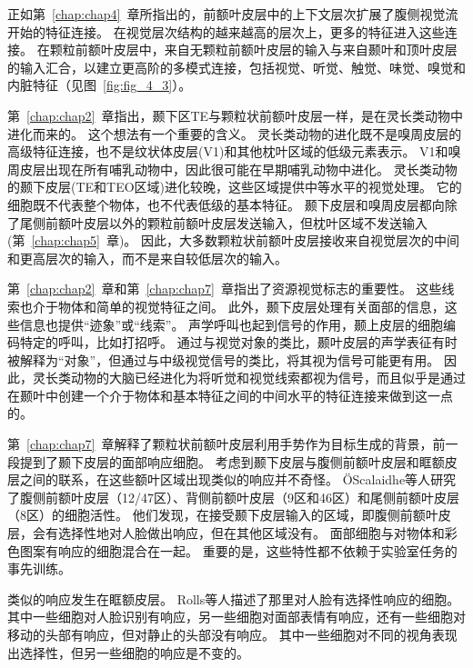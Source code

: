正如第~\ref{chap:chap4}~章所指出的，前额叶皮层中的上下文层次扩展了腹侧视觉流开始的特征连接\cite{murray2007visual}。
在视觉层次结构的越来越高的层次上，更多的特征进入这些连接。
在颗粒前额叶皮层中，来自无颗粒前额叶皮层的输入与来自颞叶和顶叶皮层的输入汇合，以建立更高阶的多模式连接，包括视觉、听觉、触觉、味觉、嗅觉和内脏特征（见图~\ref{fig:fig_4_3}）。
\par


第~\ref{chap:chap2}~章指出，颞下区TE与颗粒状前额叶皮层一样，是在灵长类动物中进化而来的。
这个想法有一个重要的含义。
灵长类动物的进化既不是嗅周皮层的高级特征连接，也不是纹状体皮层(V1)和其他枕叶区域的低级元素表示。
V1和嗅周皮层出现在所有哺乳动物中，因此很可能在早期哺乳动物中进化。
灵长类动物的颞下皮层(TE和TEO区域)进化较晚，这些区域提供中等水平的视觉处理。
它的细胞既不代表整个物体，也不代表低级的基本特征。
颞下皮层和嗅周皮层都向除了尾侧前额叶皮层以外的颗粒前额叶皮层发送输入，但枕叶区域不发送输入(第~\ref{chap:chap5}~章)。
因此，大多数颗粒状前额叶皮层接收来自视觉层次的中间和更高层次的输入，而不是来自较低层次的输入。
\par


第~\ref{chap:chap2}~章和第~\ref{chap:chap7}~章指出了资源视觉标志的重要性。
这些线索也介于物体和简单的视觉特征之间。
此外，颞下皮层处理有关面部的信息\cite{baylis1987functional,tanaka1991coding}，这些信息也提供“迹象”或“线索”。
声学呼叫也起到信号的作用，颞上皮层的细胞编码特定的呼叫，比如打招呼\cite{rauschecker1995processing}。
通过与视觉对象的类比，颞叶皮层的声学表征有时被解释为“对象”，但通过与中级视觉信号的类比，将其视为信号可能更有用。
因此，灵长类动物的大脑已经进化为将听觉和视觉线索都视为信号，而且似乎是通过在颞叶中创建一个介于物体和基本特征之间的中间水平的特征连接来做到这一点的。
\par


第~\ref{chap:chap7}~章解释了颗粒状前额叶皮层利用手势作为目标生成的背景，前一段提到了颞下皮层的面部响应细胞。
考虑到颞下皮层与腹侧前额叶皮层和眶额皮层之间的联系，在这些额叶区域出现类似的响应并不奇怪。
ÖScalaidhe等人\cite{o1999face}研究了腹侧前额叶皮层（12/47区）、背侧前额叶皮层（9区和46区）和尾侧前额叶皮层（8区）的细胞活性。
他们发现，在接受颞下皮层输入的区域，即腹侧前额叶皮层，会有选择性地对人脸做出响应，但在其他区域没有。
面部细胞与对物体和彩色图案有响应的细胞混合在一起。
重要的是，这些特性都不依赖于实验室任务的事先训练。
\par


类似的响应发生在眶额皮层。
Rolls等人\cite{rolls2006face}描述了那里对人脸有选择性响应的细胞。
其中一些细胞对人脸识别有响应，另一些细胞对面部表情有响应，还有一些细胞对移动的头部有响应，但对静止的头部没有响应。
其中一些细胞对不同的视角表现出选择性，但另一些细胞的响应是不变的。
\par


